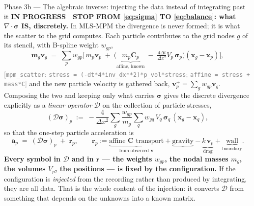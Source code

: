 \documentclass[11pt,a4paper]{article}
\newcommand{\code}[1]{\texttt{#1}}
\newcommand{\Mat}[1]{\mathbf{#1}}
\newcommand{\src}[1]{{\footnotesize\textcolor{grey}{[#1]}}}
\newcommand{\prog}{\textcolor{warn}{\textbf{IN PROGRESS}}}
\newcommand{\stopp}{\textcolor{bad!30!white}{\textbf{STOP}}}
\begin{document}
\begin{phasebox}{Phase 3b --- The algebraic inverse: injecting the data instead of integrating past it \hfill \prog\ \ \stopp}
\medskip
\textbf{FROM \eqref{eq:sigma} TO \eqref{eq:balance}: what $\nabla\!\cdot\!\boldsymbol\sigma$ IS,
discretely.} In MLS-MPM the divergence is never formed; it is what the scatter to the grid computes.
Each particle contributes to the grid nodes $g$ of its stencil, with B-spline weight $w_{gp}$,
\begin{equation}
\Mat m_g \Mat v_g \;=\; \sum_p w_{gp}\Big[\, m_p\Mat v_p \;+\;
\big(\underbrace{m_p\Mat C_p}_{\text{affine, known}} \;-\; \tfrac{4\Delta t}{\Delta x^{2}}V_p\,\boldsymbol\sigma_p\big)
(\Mat x_g - \Mat x_p)\Big],
\label{eq:p2g}
\end{equation}
\src{\code{mpm\_scatter}: \code{stress = (-dt*4*inv\_dx**2)*p\_vol*stress}; \code{affine = stress + mass*C}}
and the new particle velocity is gathered back, $\Mat v_p^{+} = \sum_g w_{gp}\Mat v_g$. Composing the
two and keeping only what carries $\boldsymbol\sigma$ gives the discrete divergence explicitly as a
\emph{linear operator} $\mathcal D$ on the collection of particle stresses,
\begin{equation}
(\mathcal D\boldsymbol\sigma)_p \;:=\; -\frac{4}{\Delta x^{2}}
\sum_g \frac{w_{gp}}{m_g}\sum_q w_{gq}\,V_q\,\boldsymbol\sigma_q\,(\Mat x_g - \Mat x_q),
\label{eq:Dop}
\end{equation}
so that the one-step particle acceleration is
\begin{equation}
\Mat a_p \;=\; (\mathcal D\boldsymbol\sigma)_p \;+\; \Mat r_p ,
\qquad
\Mat r_p := \underbrace{\text{affine } \Mat C \text{ transport}}_{\text{from observed } \Mat v}
+ \underbrace{\text{gravity}}_{} - \underbrace{k\,\Mat v_p}_{\text{drag}}
+ \underbrace{\text{wall}}_{\text{boundary}} .
\label{eq:step}
\end{equation}
\textbf{Every symbol in $\mathcal D$ and in $\Mat r$ --- the weights $w_{gp}$, the nodal masses
$m_g$, the volumes $V_p$, the positions --- is fixed by the configuration.} If the configuration is
\emph{injected} from the recording rather than produced by integrating, they are all data. That is
the whole content of the injection: it converts $\mathcal D$ from something that depends on the
unknowns into a known matrix.


\end{phasebox}
\end{document}
